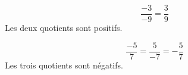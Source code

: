 \begin{myexs}
\vspace*{-1cm}


	
	\begin{multicols}{2}
		\begin{equation*}
			\dfrac{-3}{-9} = \frac{3}{9}
		\end{equation*}
	Les deux quotients sont positifs.
		
		
		\begin{equation*}
			\dfrac{-5}{7} = \dfrac{5}{-7} = -\dfrac{5}{7}
		\end{equation*}
	Les trois quotients sont négatifs.
	\end{multicols}
	
\end{myexs}

